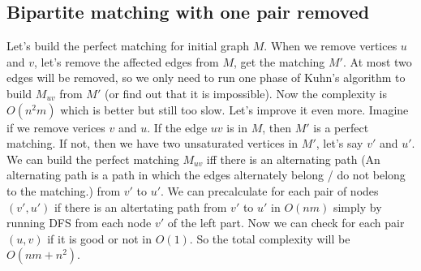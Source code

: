 	\subsection{Bipartite matching with one pair removed}
	Let's build the perfect matching for initial graph $M$. When we remove vertices $u$ and $v$, let's remove the
	affected edges from $M$, get the matching $M'$. At most two edges will be removed, so we only need to
	run one phase of Kuhn's algorithm to build $M_{uv}$ from $M'$ (or find out that it is impossible). Now the
	complexity is $O(n^2 m)$ which is better but still too slow. Let's improve it even more.
	Imagine if we remove verices $v$ and $u$. If the edge $uv$ is in $M$, then $M'$
	is a perfect matching. If not, then we have two unsaturated vertices in $M'$, let's say $v'$ and $u'$. 
	We can build the perfect matching $M_{uv}$ iff there is an alternating path 
	(An alternating path is a path in which the edges alternately belong / do not belong to the matching.)
	from $v'$ to $u'$. 
	We can precalculate for each pair of nodes $(v', u')$ if there is an
	altertating path from $v'$ to $u'$ in $O(nm)$ simply by running DFS from each node $v'$ of the left part.
	Now we can check for each pair $(u, v)$ if it is good or not in $O(1)$. 
	So the total complexity will be $O(nm + n^2)$.

